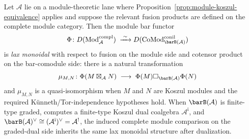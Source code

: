 \begin{theorem}
\label{thm:monoidal-module-koszul}
Let $\mathcal{A}$ lie on a module-theoretic lane where
Proposition~\ref{prop:module-koszul-equivalence} applies and suppose
the relevant fusion products are defined on the complete module
category. Then the module bar functor
\[
\Phi\colon
D(\mathrm{Mod}^{\mathrm{compl}}_{\mathcal{A}})
\;\xrightarrow{\;\sim\;}
D(\mathrm{CoMod}^{\mathrm{conil}}_{\barB(\mathcal{A})})
\]
is \emph{lax monoidal} with respect to fusion on the module side and
cotensor product on the bar-comodule side: there is a natural
transformation
\begin{equation}\label{eq:monoidal-bar}
\mu_{M,N}\colon
\Phi(M \boxtimes_{\mathcal{A}} N)
\;\longrightarrow\;
\Phi(M) \square_{\barB(\mathcal{A})} \Phi(N)
\end{equation}
and $\mu_{M,N}$ is a quasi-isomorphism when $M$ and $N$ are
Koszul modules and the required K\"unneth/Tor-independence hypotheses
hold. When $\barB(\mathcal{A})$ is finite-type graded, computes a
finite-type Koszul dual coalgebra $\mathcal{A}^{\mathrm{i}}$, and
$\barB(\mathcal{A})^\vee \cong
(\mathcal{A}^{\mathrm{i}})^\vee=\mathcal{A}^!$, the induced complete
module comparison on the graded-dual side inherits the same lax
monoidal structure after dualization.
\end{theorem}

